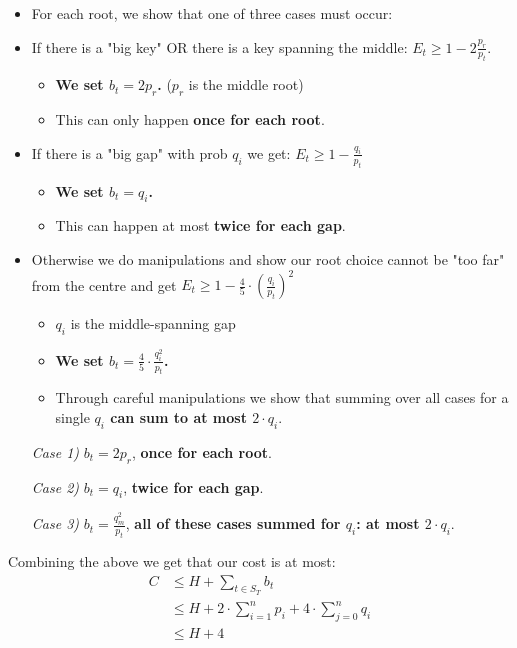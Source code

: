 \documentclass{beamer}
\theoremstyle{plain}
\begin{document}
\begin{frame}

\begin{itemize}
\item<1-> For each root, we show that one of three cases must occur:

\item<2->[\textit{Case 1)}] If there is a "big key" OR there is a key spanning the middle: $E_t \geq 1-2 \frac{p_r}{p_t}$. 
\begin{itemize}
\item \textbf{We set $b_t = 2p_r$.} ($p_r$ is the middle root)
\item This can only happen \textbf{once for each root}.
\end{itemize}

\item<3->[\textit{Case 2)}] If there is a "big gap" with prob $q_i$ we get: $E_t \geq 1-\frac{q_i}{p_t}$ 
\begin{itemize}
\item \textbf{We set $b_t = q_i$.}
\item This can happen at most \textbf{twice for each gap}.
\end{itemize}

\item<4->[\textit{Case 3)}] Otherwise we do manipulations and show our root choice cannot be "too far" from the centre and get $E_t \geq 1 - \frac{4}{5} \cdot \left( \frac{q_i}{p_t}\right)^2$
\begin{itemize}
\item $q_i$ is the middle-spanning gap
\item \textbf{We set $b_t = \frac{4}{5} \cdot \frac{q_i^2}{p_t}$.}
\item Through careful manipulations we show that summing over all cases for a single \textbf{$q_i$ can sum to at most $2\cdot q_i$}.
\end{itemize} 
\end{itemize}
\end{frame}

\begin{frame}{}
\begin{itemize}
\item[\textit{Case 1)}] $b_t = 2p_r$, \textbf{once for each root}.

\item[\textit{Case 2)}]$b_t = q_i$, \textbf{twice for each gap}.

\item[\textit{Case 3)}] $b_t = \frac{q_m^2}{p_t}$, \textbf{all of these cases summed for $q_i$: at most $2\cdot q_i$}.
\end{itemize}

Combining the above we get that our cost is at most:
\begin{align*}
C &\leq H + \sum_{t \in S_T} b_t \\
 &\leq H + 2 \cdot \sum_{i=1}^{n} p_i + 4 \cdot \sum_{j=0}^{n} q_i \\
 &\leq H + 4
\end{align*}
\end{frame}
\end{document}
